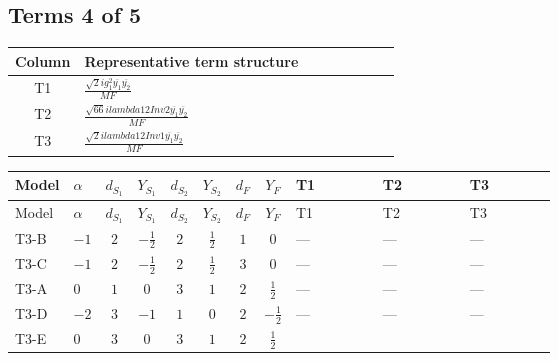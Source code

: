 \documentclass[8pt]{article}
\begin{document}
\begin{landscape}
\subsection*{Terms 4 of 5}
\begin{center}
\begin{tabular}{@{}c >{\raggedright\arraybackslash}p{0.82\linewidth}@{}}
\toprule
Column & Representative term structure \\
\midrule
T1 & \(\displaystyle \frac{\sqrt{2} i g_{1}^{2} \overline{y_{1}} \overline{y_{2}}}{MF}\) \\
\midrule
T2 & \(\displaystyle \frac{\sqrt{66} i lambda12Inv2 \overline{y_{1}} \overline{y_{2}}}{MF}\) \\
\midrule
T3 & \(\displaystyle \frac{\sqrt{2} i lambda12Inv1 \overline{y_{1}} \overline{y_{2}}}{MF}\) \\
\midrule
\bottomrule
\end{tabular}
\end{center}
\smallskip
\tiny
\begin{longtable}{@{}llcccccc >{\raggedright\arraybackslash}p{0.21\linewidth} >{\raggedright\arraybackslash}p{0.21\linewidth} >{\raggedright\arraybackslash}p{0.21\linewidth}@{}}
\toprule
Model & $\alpha$ & $d_{S_1}$ & $Y_{S_1}$ & $d_{S_2}$ & $Y_{S_2}$ & $d_F$ & $Y_F$ & T1 & T2 & T3 \\
\midrule
\endfirsthead
\toprule
Model & $\alpha$ & $d_{S_1}$ & $Y_{S_1}$ & $d_{S_2}$ & $Y_{S_2}$ & $d_F$ & $Y_F$ & T1 & T2 & T3 \\
\midrule
\endhead
T3-B & $-1$ & $2$ & $-\frac{1}{2}$ & $2$ & $\frac{1}{2}$ & $1$ & $0$ & --- & --- & --- \\
\midrule
T3-C & $-1$ & $2$ & $-\frac{1}{2}$ & $2$ & $\frac{1}{2}$ & $3$ & $0$ & --- & --- & --- \\
\midrule
T3-A & $0$ & $1$ & $0$ & $3$ & $1$ & $2$ & $\frac{1}{2}$ & --- & --- & --- \\
\midrule
T3-D & $-2$ & $3$ & $-1$ & $1$ & $0$ & $2$ & $-\frac{1}{2}$ & --- & --- & --- \\
\midrule
T3-E & $0$ & $3$ & $0$ & $3$ & $1$ & $2$ & $\frac{1}{2}$ & \scriptsize\adjustbox{max width=\linewidth}{$\begin{gathered} - \frac{3 \sqrt{2} i g_{1}^{2} \overline{y_{1}} \overline{y_{2}}}{16 MF}\end{gathered}$} & \scriptsize\adjustbox{max width=\linewidth}{$\begin{gathered} - \frac{3 \sqrt{66} i lambda12Inv2 \overline{y_{1}} \overline{y_{2}}}{44 MF}\end{gathered}$} & \scriptsize\adjustbox{max width=\linewidth}{$\begin{gathered} \frac{\sqrt{2} i lambda12Inv1 \overline{y_{1}} \overline{y_{2}}}{4 MF}\end{gathered}$} \\
\midrule
\bottomrule
\end{longtable}
\clearpage

\end{landscape}
\end{document}
